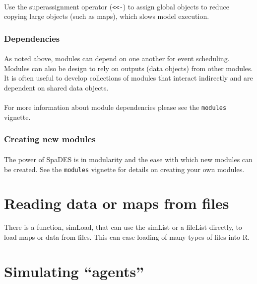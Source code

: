 \documentclass{article}
\begin{document}
\paragraph{}
Use the superassignment operator (\texttt{<}\texttt{<-}) to assign global objects to reduce copying large objects (such as maps), which slows model execution.

\subsubsection{Dependencies}

\paragraph{}
As noted above, modules can depend on one another for event scheduling. Modules can also be design to rely on outputs (data objects) from other modules. It is often useful to develop collections of modules that interact indirectly and are dependent on shared data objects.

\paragraph{}
For more information about module dependencies please see the \texttt{modules} vignette.

\subsubsection{Creating new modules}

\paragraph{}
The power of SpaDES is in modularity and the ease with which new modules can be created. See the \texttt{modules} vignette for details on creating your own modules.

\newpage

\section{Reading data or maps from files}
There is a function, simLoad, that can use the simList or a fileList directly, to load maps or data from files. This can ease loading of many types of files into R.

\newpage

\section{Simulating ``agents''}
\end{document}
